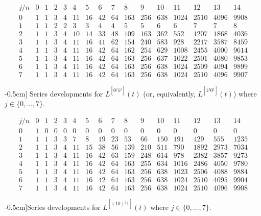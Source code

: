 \begin{table}
\begin{equation*}\begin{array}{c|ccccccccccccccc}j/n & 0 & 1 & 2 & 3 & 4 & 5 & 6 & 7 & 8 & 9 & 10 & 11 & 12 & 13 & 14\\\hline0 & 1 & 1 & 3 & 4 & 11 & 16 & 42 & 64 & 163 & 256 & 638 & 1024 & 2510 & 4096 & 9908\\1 & 1 & 1 & 2 & 2 & 3 & 3 & 4 & 4 & 5 & 5 & 6 & 6 & 7 & 7 & 8\\2 & 1 & 1 & 3 & 4 & 10 & 14 & 33 & 48 & 109 & 163 & 362 & 552 & 1207 & 1868 & 4036\\3 & 1 & 1 & 3 & 4 & 11 & 16 & 41 & 62 & 154 & 240 & 583 & 928 & 2217 & 3587 & 8459\\4 & 1 & 1 & 3 & 4 & 11 & 16 & 42 & 64 & 162 & 254 & 629 & 1008 & 2455 & 4000 & 9614\\5 & 1 & 1 & 3 & 4 & 11 & 16 & 42 & 64 & 163 & 256 & 637 & 1022 & 2501 & 4080 & 9853\\6 & 1 & 1 & 3 & 4 & 11 & 16 & 42 & 64 & 163 & 256 & 638 & 1024 & 2509 & 4094 & 9899\\7 & 1 & 1 & 3 & 4 & 11 & 16 & 42 & 64 & 163 & 256 & 638 & 1024 & 2510 & 4096 & 9907\end{array}\end{equation*}
\caption[Series developments for $L^{[0^{j}1^j]}(t)$  where $j\in \lbrace 0,\ldots,7 \rbrace$.]
        [-0.5cm]{
            Series developments for $L^{[0^{j}1^j]}(t)$ (or, equivalently,
            $L^{[1^{j}0^j]}(t)$) where $j\in \lbrace 0,\ldots,7 \rbrace$.
        }
\label{tbl:L0_j:1_j}
\end{table}

\begin{table}
\begin{equation*}\begin{array}{c|ccccccccccccccc}j/n & 0 & 1 & 2 & 3 & 4 & 5 & 6 & 7 & 8 & 9 & 10 & 11 & 12 & 13 & 14\\\hline0 & 1 & 0 & 0 & 0 & 0 & 0 & 0 & 0 & 0 & 0 & 0 & 0 & 0 & 0 & 0\\1 & 1 & 1 & 3 & 3 & 7 & 8 & 19 & 23 & 53 & 66 & 150 & 191 & 429 & 555 & 1235\\2 & 1 & 1 & 3 & 4 & 11 & 15 & 38 & 56 & 139 & 210 & 511 & 790 & 1892 & 2973 & 7034\\3 & 1 & 1 & 3 & 4 & 11 & 16 & 42 & 63 & 159 & 248 & 614 & 978 & 2382 & 3857 & 9273\\4 & 1 & 1 & 3 & 4 & 11 & 16 & 42 & 64 & 163 & 255 & 634 & 1016 & 2486 & 4050 & 9780\\5 & 1 & 1 & 3 & 4 & 11 & 16 & 42 & 64 & 163 & 256 & 638 & 1023 & 2506 & 4088 & 9884\\6 & 1 & 1 & 3 & 4 & 11 & 16 & 42 & 64 & 163 & 256 & 638 & 1024 & 2510 & 4095 & 9904\\7 & 1 & 1 & 3 & 4 & 11 & 16 & 42 & 64 & 163 & 256 & 638 & 1024 & 2510 & 4096 & 9908\end{array}\end{equation*}
\caption[][-0.5cm]{Series developments for $L^{[(10)^{j}1]}(t)$ where $j\in \lbrace 0,\ldots,7 \rbrace$.}
\label{tbl:L10_j:1}
\end{table}

